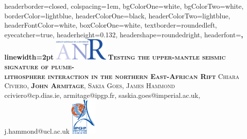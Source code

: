 \documentclass[landscape,a0paper,fontscale=0.285]{baposter} %
\begin{document}
\begin{poster}
{
headerborder=closed, %
colspacing=1em, %
bgColorOne=white, %
bgColorTwo=white, %
borderColor=lightblue, %
headerColorOne=black, %
headerColorTwo=lightblue, %
headerFontColor=white, %
boxColorOne=white, %
textborder=roundedleft, %
eyecatcher=true, %
headerheight=0.132\textheight, %
headershape=roundedright, %
headerfont=\Large\bf\textsc, %
linewidth=2pt %
}
%
{\includegraphics[height=3em]{anr}} %
{\bf\textsc{Testing the upper-mantle seismic signature of plume- \\ \vspace{0.05em} lithosphere interaction in the northern East-African Rift}\vspace{0.2em}} %
{\textsc{ Chiara Civiero, \textbf{John Armitage}, Sakia Goes, James Hammond}  \\ cciviero@cp.dias.ie, armitage@ipgp.fr, saskia.goes@imperial.ac.uk, j.hammond@ucl.ac.uk\vspace{0.3em}} %
{\includegraphics[height=5em]{LogoIPGP}} %



\end{poster}
\end{document}
